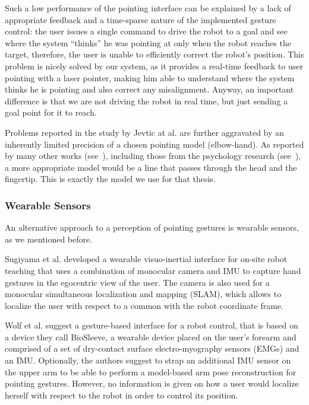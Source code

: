 Such a low performance of the pointing interface can be explained by a lack of appropriate feedback and a time-sparse nature of the implemented gesture control: the user issues a single command to drive the robot to a goal and see where the system ``thinks'' he was pointing at only when the robot reaches the target, therefore, the user is unable to efficiently correct the robot's position. This problem is nicely solved by our system, as it provides a real-time feedback to user pointing with a laser pointer, making him able to understand where the system thinks he is pointing and also correct any misalignment. Anyway, an important difference is that we are not driving the robot in real time, but just sending a goal point for it to reach.

Problems reported in the study by Jevtic at al. \cite{Jevtic2015} are further aggravated by an inherently limited precision of a chosen pointing model (elbow-hand). As reported by many other works (see~\cite{Abidi2013,Nickel2007,Droeschel2011}), including those from the psychology research (see~\cite{Taylor1988,Herbort2016}), a more appropriate model would be a line that passes through the head and the fingertip. This is exactly the model we use for that thesis.

\subsubsection*{Wearable Sensors}
An alternative approach to a perception of pointing gestures is wearable sensors, as we mentioned before. 

Sugiyama et al. \cite{Sugiyama2013} developed a wearable visuo-inertial interface for on-site robot teaching that uses a combination of monocular camera and IMU to capture hand gestures in the egocentric view of the user. The camera is also used for a monocular simultaneous localization and mapping (SLAM), which allows to localize the user with respect to a common with the robot coordinate frame.

Wolf et al. \cite{Wolf2013} suggest a gesture-based interface for a robot control, that is based on a device they call BioSleeve, a wearable device placed on the user's forearm and comprised of a set of dry-contact surface electro-myography sensors (EMGs) and an IMU. Optionally, the authors suggest to strap an additional IMU sensor on the upper arm to be able to perform a model-based arm pose reconstruction for pointing gestures. However, no information is given on how a user would localize herself with respect to the robot in order to control its position.

